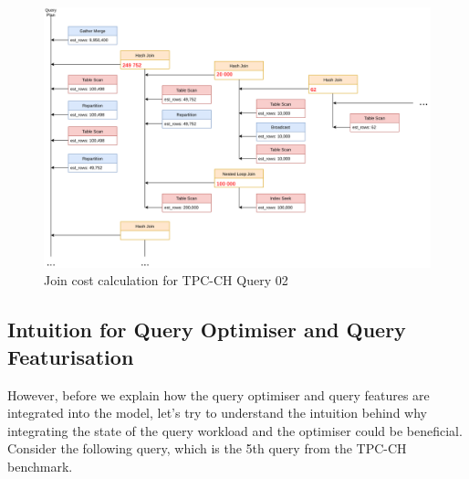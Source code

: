 \begin{figure}[h]
  \centering
  \includegraphics[width=\linewidth]{figures/query_02_plan_02.png}
  \caption{Join cost calculation for TPC-CH Query 02}
  \label{fig:join-cost-calculation}
\end{figure}


\subsection{Intuition for Query Optimiser and Query Featurisation}
However, before we explain how the query optimiser and query features are integrated into the model, let's try to understand the intuition behind why integrating the state of the query workload and the optimiser could be beneficial. Consider the following query, which is the 5th query from the TPC-CH benchmark.


